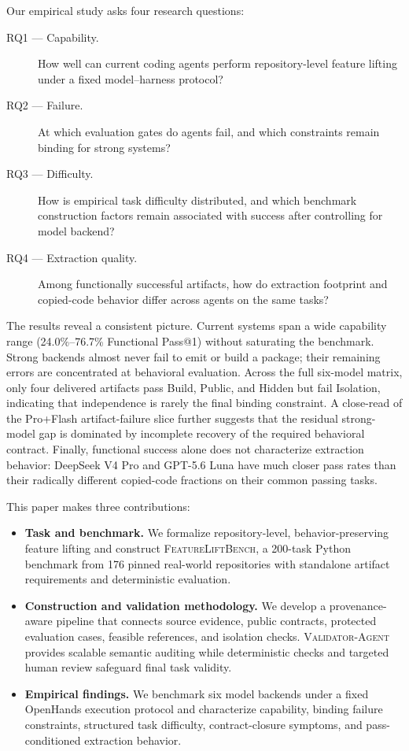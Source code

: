 \documentclass[acmsmall,screen,review,anonymous]{acmart}
\newcommand{\flb}{\textsc{FeatureLiftBench}\xspace}
\newcommand{\validatoragent}{\textsc{Validator-Agent}\xspace}
\begin{document}
Our empirical study asks four research questions:
\begin{description}
  \item[RQ1 --- Capability.] How well can current coding agents perform
        repository-level feature lifting under a fixed model--harness protocol?
  \item[RQ2 --- Failure.] At which evaluation gates do agents fail, and which
        constraints remain binding for strong systems?
  \item[RQ3 --- Difficulty.] How is empirical task difficulty distributed, and
        which benchmark construction factors remain associated with success after
        controlling for model backend?
  \item[RQ4 --- Extraction quality.] Among functionally successful artifacts, how
        do extraction footprint and copied-code behavior differ across agents on
        the same tasks?
\end{description}

The results reveal a consistent picture. Current systems span a wide capability
range (24.0\%--76.7\% Functional Pass@1) without saturating the benchmark. Strong
backends almost never fail to emit or build a package; their remaining errors are
concentrated at behavioral evaluation. Across the full six-model matrix, only four
delivered artifacts pass Build, Public, and Hidden but fail Isolation, indicating
that independence is rarely the final binding constraint. A close-read of the
Pro+Flash artifact-failure slice further suggests that the residual strong-model
gap is dominated by incomplete recovery of the required behavioral contract.
Finally, functional success alone does not characterize extraction behavior:
DeepSeek V4 Pro and GPT-5.6 Luna have much closer pass rates than their radically
different copied-code fractions on their common passing tasks.

This paper makes three contributions:
\begin{itemize}
  \item \textbf{Task and benchmark.} We formalize repository-level,
        behavior-preserving feature lifting and construct \flb, a 200-task Python
        benchmark from 176 pinned real-world repositories with standalone
        artifact requirements and deterministic evaluation.
  \item \textbf{Construction and validation methodology.} We develop a
        provenance-aware pipeline that connects source evidence, public contracts,
        protected evaluation cases, feasible references, and isolation checks.
        \validatoragent provides scalable semantic auditing while deterministic
        checks and targeted human review safeguard final task validity.
  \item \textbf{Empirical findings.} We benchmark six model backends under a fixed
        OpenHands execution protocol and characterize capability, binding failure
        constraints, structured task difficulty, contract-closure symptoms, and
        pass-conditioned extraction behavior.
\end{itemize}
\end{document}
